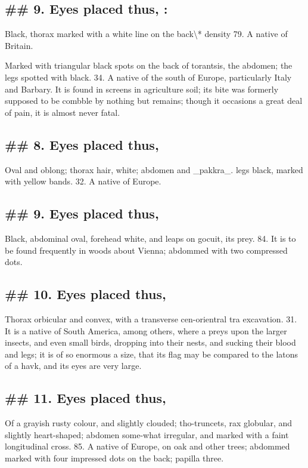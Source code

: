 \subsection*{\#\# 9. Eyes placed thus, :}
Black, thorax marked with a white line on the back\textbackslash{}* density 79. A native of Britain.\par\medskip
Marked with triangular black spots on the back of torantsis, the abdomen; the legs spotted with black. 34. A native of the south of Europe, particularly Italy and Barbary. It is found in screens in agriculture soil; its bite was formerly supposed to be combble by nothing but remains; though it occasions a great deal of pain, it is almost never fatal.\par\medskip
\subsection*{\#\# 8. Eyes placed thus,}
Oval and oblong; thorax hair, white; abdomen and \_pakkra\_. legs black, marked with yellow bands. 32. A native of Europe.\par\medskip
\subsection*{\#\# 9. Eyes placed thus,}
Black, abdominal oval, forehead white, and leaps on gocuit, its prey. 84. It is to be found frequently in woods about Vienna; abdommed with two compressed dots.\par\medskip
\subsection*{\#\# 10. Eyes placed thus,}
Thorax orbicular and convex, with a transverse cen-orientral tra excavation. 31. It is a native of South America, among others, where a preys upon the larger insects, and even small birds, dropping into their nests, and sucking their blood and legs; it is of so enormous a size, that its flag may be compared to the latons of a havk, and its eyes are very large.\par\medskip
\subsection*{\#\# 11. Eyes placed thus,}
Of a grayish rusty colour, and slightly clouded; tho-truncets, rax globular, and slightly heart-shaped; abdomen some-what irregular, and marked with a faint longitudinal cross. 85. A native of Europe, on oak and other trees; abdommed marked with four impressed dots on the back; papilla three.\par\medskip

